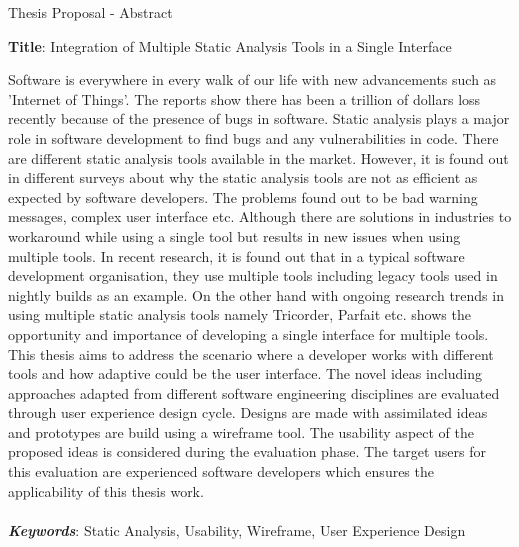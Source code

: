 \documentclass{article}
\begin{document}
	
	\begin{center}
		Thesis Proposal - Abstract 
	\end{center}

\begin{center}
	\textbf{Title}: Integration of Multiple Static Analysis Tools in a Single Interface \\
\end{center}	

Software is everywhere in every walk of our life with new advancements such as 'Internet of Things'. The reports show there has been a trillion of dollars loss recently because of the presence of bugs in software.  Static analysis plays a major role in software development to find bugs and any vulnerabilities in code. There are different static analysis tools available in the market. However, it is found out in different surveys about why the static analysis tools are not as efficient as expected by software developers. The problems found out to be bad warning messages, complex user interface etc. Although there are solutions in industries to workaround while using a single tool but results in new issues when using multiple tools. In recent research, it is found out that in a typical software development organisation, they use multiple tools including legacy tools used in nightly builds as an example. On the other hand with ongoing research trends in using multiple static analysis tools namely Tricorder, Parfait etc. shows the opportunity and importance of developing a single interface for multiple tools. This thesis aims to address the scenario where a developer works with different tools and how adaptive could be the user interface. The novel ideas including approaches adapted from different software engineering disciplines are evaluated through user experience design cycle. Designs are made with assimilated ideas and prototypes are build using a wireframe tool. The usability aspect of the proposed ideas is considered during the evaluation phase. The target users for this evaluation are experienced software developers which ensures the applicability of this thesis work. \\ \\
\textbf{\textit{Keywords}}: Static Analysis, Usability, Wireframe, User Experience Design
	
\end{document}
